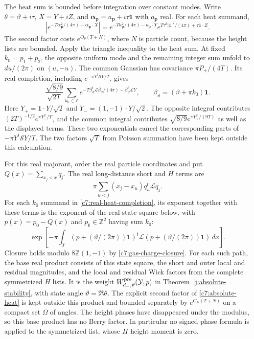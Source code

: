 The heat sum is bounded before integration over constant modes.  Write
$\theta=\vartheta+i\tau$, $X=Y+iZ$, and
$\boldsymbol\alpha_{\mathbf p}=a_{\mathbf p}+i\tau\mathbf1$ with
$a_{\mathbf p}$ real.  For each heat summand,
\begin{equation}\label{c7:absolute-heat}
\left|e^{-T\boldsymbol\alpha_{\mathbf p}^2/(4\pi)
              -\boldsymbol\alpha_{\mathbf p}\cdot X}\right|
=e^{-Ta_{\mathbf p}^2/(4\pi)-a_{\mathbf p}\cdot Y}
 e^{T\tau^2|\mathbf1|^2/(4\pi)+\tau\mathbf1\cdot Z}.
\end{equation}
The second factor costs $e^{O_\theta(T+N)}$, where $N$ is particle count,
because the height lists are bounded.  Apply the triangle inequality to the
heat sum.  At fixed $k_0=p_1+p_2$, the opposite uniform mode and the remaining
integer sum unfold to $du/(2\pi)$ on $(u,-u)$.  The common Gaussian has
covariance $\pi P_+/(4T)$.  Its real completion, including
$e^{-\pi Y^t\mathcal S Y/T}$, gives
\begin{equation}\label{c7:real-heat-completion}
\frac{\sqrt{8/9}}{\sqrt{2T}}\sum_{k_0\in\mathbb Z}
 e^{-T\beta_\vartheta^t\mathcal L\beta_\vartheta/(4\pi)
       -\beta_\vartheta^t\mathcal L Y},
\qquad \beta_\vartheta=(\vartheta+\pi k_0)\mathbf1.
\end{equation}
Here $Y_+=\mathbf1\cdot Y/\sqrt2$ and
$Y_-=(1,-1)\cdot Y/\sqrt2$.  The opposite integral contributes
$(2T)^{-1/2}e^{\pi Y_-^2/T}$, and the common integral contributes
$\sqrt{8/9}e^{\pi Y_+^2/(9T)}$ as well as the displayed terms.  These two
exponentials cancel the corresponding parts of $-\pi Y^t\mathcal S Y/T$.
The two factors $\sqrt T$ from Poisson summation have been kept outside this
calculation.

For this real majorant, order the real particle coordinates and put
$Q(x)=\sum_{x_j<x}q_j$.  The real long-distance short and $H$ terms are
\[
\pi\sum_{u<j}(x_j-x_u)q_u^t\mathcal Lq_j.
\]
For each $k_0$ summand in \eqref{c7:real-heat-completion}, its exponent
together with these terms is the exponent of the real state square below,
with $p(x)=p_0-Q(x)$ and $p_0\in\mathbb Z^2$ having sum $k_0$:
\[
\exp\!\left[-\pi\int_T
 (p+(\vartheta/(2\pi))\mathbf1)^t\mathcal L
 (p+(\vartheta/(2\pi))\mathbf1)\,dx\right].
\]
Closure holds modulo $8\mathbb Z(1,-1)$ by
\eqref{c7:gas-charge-closure}.  For each such path, the base real product
consists of this state square, the short and outer local and residual
magnitudes, and the local and residual Wick factors from the complete
symmetrized $H$ lists.  It is the weight
$W^{\rm pre}_{d_-,\vartheta}(\mathcal Y,p)$ in
Theorem~\ref{j:absolute-stability}, with state angle
$\vartheta=\Re\theta$.  The explicit second factor of
\eqref{c7:absolute-heat} is kept outside this product and bounded separately
by $e^{C_\Omega(T+N)}$ on a compact set $\Omega$ of angles.  The height
phases have disappeared under the modulus, so this base product has no Berry
factor.  In particular no signed phase formula is applied to the symmetrized
list, whose $H$ height moment is zero.


